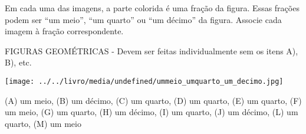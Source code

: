 \documentclass[a4paper,12pt,twoside]{book}
\begin{document}
Em cada uma das imagens, a parte colorida é uma fração da figura. Essas frações podem ser ``um meio'', ``um quarto'' ou ``um décimo'' da figura. Associe cada imagem à fração correspondente.

\begin{imagem*}[breakable]{}{}   FIGURAS GEOMÉTRICAS - Devem ser feitas individualmente sem os itens A), B), etc.  
  
    \texttt{[image: ../../livro/media/undefined/ummeio\_umquarto\_um\_decimo.jpg]}  
  
  
\end{imagem*}


\begin{resposta*}[breakable]{}{}   (A) um meio,  (B) um décimo, (C) um quarto, (D) um quarto,  \mbox{} \newline   
  (E) um quarto, (F) um meio, (G) um quarto, (H) um décimo,  \mbox{} \newline   
  (I) um quarto, (J) um décimo, (L) um quarto, (M) um meio  
\end{resposta*}
\end{document}
